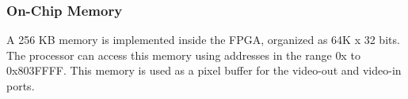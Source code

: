 \subsubsection{On-Chip Memory}
A 256 KB memory is implemented inside the FPGA, organized as 64K {\sf x} 32 bits. The 
{\processor} processor can access this memory using addresses in the range 
{\sf 0x} to {\sf 0x\baseAddressOffset 803FFFF}. This
memory is used as a pixel buffer for the video-out and video-in ports.

